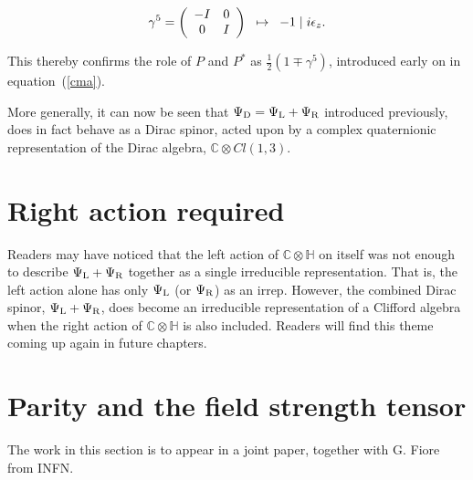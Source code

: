 \documentclass[letterpaper,12pt,titlepage,oneside,final]{book}
\newcommand{\CH}{\mathbb{C}\otimes\mathbb{H}}
\begin{document}
\begin{equation} \gamma^5 = \left(   \begin{array}{cc} -I & 0 \\ 0 & I 
\end{array}\right)  \hspace{2mm} \mapsto \hspace{2mm} -1\hspace{1mm} | \hspace{1mm} i{\epsilon_z}.
\end{equation}

\noindent This thereby confirms the role of $P$ and $P^*$ as $\frac{1}{2}\left(1\mp\gamma^5\right)$, introduced early on in equation~(\ref{cma}).

More generally, it can now be seen that $  \Psi_{\textup{D}} =   \Psi_{\textup{L}}+  \Psi_{\textup{R}}$ introduced previously, does in fact behave as a Dirac spinor, acted upon by a complex quaternionic representation of the Dirac algebra, $\mathbb{C}\otimes Cl(1,3)$.




\section{Right action required\label{rar}  }

Readers may have noticed that the left action of $\CH$ on itself was not enough to describe $\Psi_{\textup{L}}+\Psi_{\textup{R}}$ together as a single irreducible representation.  That is, the left action alone has only $\Psi_{\textup{L}}$ (or $\Psi_{\textup{R}}$) as an irrep.  However, the combined Dirac spinor, $\Psi_{\textup{L}}+\Psi_{\textup{R}}$, does become an irreducible representation of a Clifford algebra when the right action of $\CH$ is also included.  Readers will find this theme coming up again in future chapters.





\section{Parity and the field strength tensor\label{Fmunu}  }


The work in this section is to appear in a joint paper, together with G. Fiore from INFN.
\end{document}
